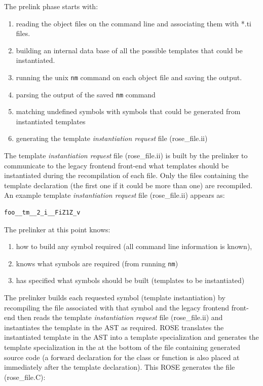 {   The prelink phase starts with:
\begin{enumerate}
   \item reading the object files on the command line and associating them with *.ti files.  
   \item building an internal data base of all the possible templates that could be instantiated.
   \item running the unix {\tt nm} command on each object file and saving the output.
   \item parsing the output of the saved {\tt nm} command
   \item matching undefined symbols with symbols that could be generated from instantiated templates
   \item generating the template {\em instantiation request} file (rose\_file.ii)
\end{enumerate}

The template {\em instantiation request} file (rose\_file.ii) is built by the prelinker 
to communicate to the legacy frontend front-end what templates should be instantiated during the 
recompilation of each file.  Only the files containing the template declaration
(the first one if it could be more than one) are recompiled.  An example template 
{\em instantiation request} file (rose\_file.ii) appears as:

{\indent
{\mySmallFontSize

\begin{verbatim}
foo__tm__2_i__FiZ1Z_v
\end{verbatim}
}}

   The prelinker at this point knows:
\begin{enumerate}
   \item how to build any symbol required (all command line information is known),
   \item knows what symbols are required (from running {\tt nm})
   \item has specified what symbols should be built (templates to be instantiated)
\end{enumerate}

  The prelinker builds each requested symbol (template instantiation) by recompiling
the file associated with that symbol and the legacy frontend front-end then reads the template 
{\em instantiation request} file (rose\_file.ii) and instantiates the template
in the AST as required.  ROSE translates the instantiated template in the AST into
a template specialization and generates the template specialization in the 
at the bottom of the file containing generated source code (a forward declaration
for the class or function is also placed at immediately after the template declaration).
This ROSE generates the file (rose\_file.C):

}
